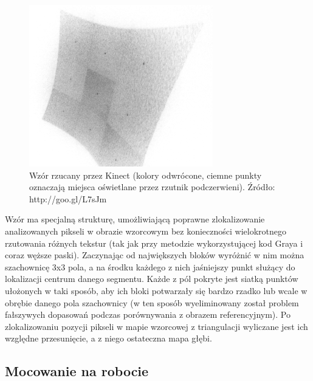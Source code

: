\begin{figure}[h!]
\centering
\includegraphics[width=8cm]{../img/kinect_pattern}
\caption[Wzór rzucany przez Kinect]{Wzór rzucany przez Kinect (kolory odwrócone,
ciemne punkty oznaczają miejsca oświetlane przez rzutnik podczerwieni). Źródło:
http://goo.gl/L7sJm}
\label{fig:kinect_pattern}
\end{figure}

Wzór ma specjalną strukturę, umożliwiającą poprawne zlokalizowanie analizowanych
pikseli w obrazie wzorcowym bez konieczności wielokrotnego rzutowania różnych
tekstur (tak jak przy metodzie wykorzystującej kod Graya i coraz węższe paski).
Zaczynając od największych bloków wyróżnić w nim można szachownicę 3x3 pola, a
na środku każdego z nich jaśniejszy punkt służący do lokalizacji centrum danego
segmentu. Każde z pól pokryte jest siatką punktów ułożonych w taki sposób, aby
ich bloki potwarzały się bardzo rzadko lub wcale w obrębie danego pola
szachownicy (w ten sposób wyeliminowany został problem fałszywych dopasowań
podczas porównywania z obrazem referencyjnym). Po zlokalizowaniu pozycji
pikseli w mapie wzorcowej z triangulacji wyliczane jest ich względne
przesunięcie, a z niego ostateczna mapa głębi.

\subsection{Mocowanie na robocie}

